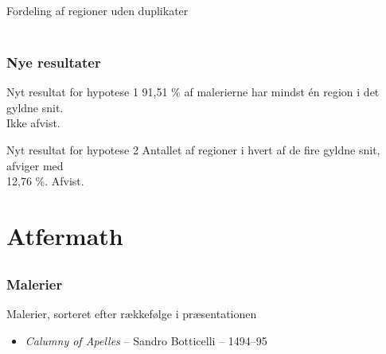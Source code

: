 \documentclass[xcolor=table]{beamer}
\begin{document}
\begin{frame}
\begin{columns}[t]
            Fordeling af regioner uden duplikater
    \end{columns}

\end{frame}

\subsection*{}
\begin{frame}

    \frametitle{Nye resultater}

    \begin{block}{Nyt resultat for hypotese 1}
        91,51 \% af malerierne har mindst én region i det gyldne snit.\\
        \alert{Ikke afvist.}
    \end{block}

    \begin{block}{Nyt resultat for hypotese 2}
        Antallet af regioner i hvert af de fire gyldne snit, afviger med \\12,76 \%.
        \alert{Afvist.}
    \end{block}

\end{frame}

\section{Atfermath}
\subsection*{}
\begin{frame}

    \frametitle{Malerier}

    Malerier, sorteret efter rækkefølge i præsentationen

    \begin{itemize}
        \item \emph{Calumny of Apelles} -- Sandro Botticelli -- 1494--95
    \end{itemize}


\end{frame}
\end{document}
